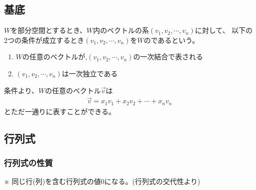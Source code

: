 \documentclass[a4paper]{jsarticle}
\begin{document}
\subsection{基底}
$W$を部分空間とするとき、$W$内のベクトルの系$\left(v_1,v_2,\cdots,v_n\right)$に対して、
以下の2つの条件が成立するとき$\left(v_1,v_2,\cdots,v_n\right)$を$W$のであるという。
\begin{enumerate}[(1)]
    \item $W$の任意のベクトルが,$\left(v_1,v_2,\cdots,v_n\right)$の一次結合で表される
    \item $\left(v_1,v_2,\cdots,v_n\right)$は一次独立である
\end{enumerate}
条件より、$W$の任意のベクトル$\vec{v}$は
\begin{eqnarray*}
    \vec{v}=x_1v_1+x_2v_2+\cdots+x_nv_n
\end{eqnarray*}
とただ一通りに表すことができる。
\subsection{行列式}
\subsubsection{行列式の性質}
※ 同じ行(列)を含む行列式の値$0$になる。(行列式の交代性より)
\end{document}
